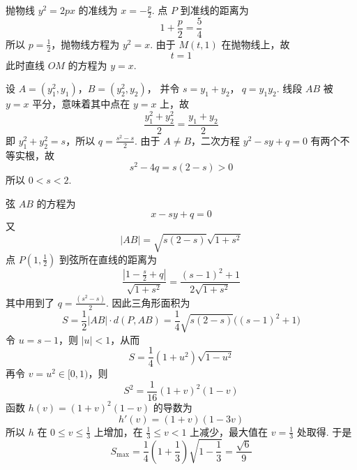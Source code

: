 \begin{solution}
抛物线 \(y^2=2px\) 的准线为 \(x=-\frac{p}{2}\). 点 \(P\) 到准线的距离为
\[
1+\frac p2=\frac54
\]
所以 \(p=\frac12\)，抛物线方程为 \(y^2=x\). 由于 \(M(t,1)\) 在抛物线上，故
\[
t=1
\]
此时直线 \(OM\) 的方程为 \(y=x\).

设 \(A=(y_1^2,y_1)\)，\(B=(y_2^2,y_2)\)，
并令 \(s=y_1+y_2\)，\(\ q=y_1y_2\). 线段 \(AB\) 被 \(y=x\) 平分，意味着其中点在 \(y=x\) 上，故
\[
\frac{y_1^2+y_2^2}{2}=\frac{y_1+y_2}{2}
\]
即
\(y_1^2+y_2^2=s\)，所以 \(q=\frac{s^2-s}{2}\).
由于 \(A\ne B\)，二次方程 \(y^2-sy+q=0\) 有两个不等实根，故
\[
s^2-4q=s(2-s)>0
\]
所以 \(0<s<2\).

弦 \(AB\) 的方程为
\[
x-sy+q=0
\]
又
\[
|AB|=\sqrt{s(2-s)}\sqrt{1+s^2}
\]
点 \(P(1,\frac{1}{2})\) 到弦所在直线的距离为
\[
\frac{|1-\frac s2+q|}{\sqrt{1+s^2}}
=\frac{(s-1)^2+1}{2\sqrt{1+s^2}}
\]
其中用到了 \(q=\frac{(s^2-s)}{2}\). 因此三角形面积为
\[
S=\frac12|AB|\cdot d(P,AB)
=\frac14\sqrt{s(2-s)}\bigl((s-1)^2+1\bigr)
\]
令 \(u=s-1\)，则 \(|u|<1\)，从而
\[
S=\frac14(1+u^2)\sqrt{1-u^2}
\]
再令 \(v=u^2\in[0,1)\)，则
\[
S^2=\frac1{16}(1+v)^2(1-v)
\]
函数 \(h(v)=(1+v)^2(1-v)\) 的导数为
\[
h'(v)=(1+v)(1-3v)
\]
所以 \(h\) 在 \(0\leqslant v\leqslant\frac{1}{3}\) 上增加，在 \(\frac{1}{3}\leqslant v<1\) 上减少，最大值在 \(v=\frac{1}{3}\) 处取得. 于是
\[
S_{\max}
=\frac14\left(1+\frac13\right)\sqrt{1-\frac13}
=\frac{\sqrt6}{9}
\]
\end{solution}
